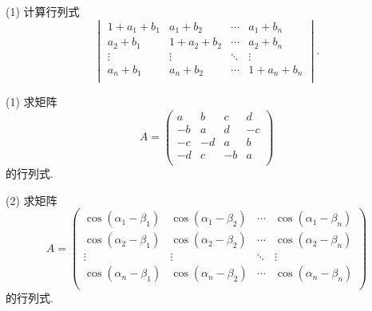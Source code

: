 \documentclass{ctexart}
\begin{document}
\begin{exercisec}[4.2.11(2)]
    (1) 计算行列式
    \[\begin{vmatrix}
        1+a_1+b_1 & a_1+b_2 & \cdots & a_1+b_n \\
        a_2+b_1 & 1+a_2+b_2 & \cdots & a_2+b_n \\
        \vdots & \vdots & \ddots & \vdots \\
        a_n+b_1 & a_n+b_2 & \cdots & 1+a_n+b_n \\
    \end{vmatrix}.\]
\end{exercisec}
\begin{exercisec}[4.2.12]
    (1) 求矩阵
    \[A=\begin{pmatrix}
        a & b & c & d \\
        -b & a & d & -c \\
        -c & -d & a & b \\
        -d & c & -b & a \\
    \end{pmatrix}\]
    的行列式.

    (2) 求矩阵
    \[A=\begin{pmatrix}
        \cos(\alpha_1-\beta_1) & \cos(\alpha_1-\beta_2) & \cdots & \cos(\alpha_1-\beta_n) \\
        \cos(\alpha_2-\beta_1) & \cos(\alpha_2-\beta_2) & \cdots & \cos(\alpha_2-\beta_n) \\
        \vdots & \vdots & \ddots & \vdots \\
        \cos(\alpha_n-\beta_1) & \cos(\alpha_n-\beta_2) & \cdots & \cos(\alpha_n-\beta_n) \\
    \end{pmatrix}\]
    的行列式.
\end{exercisec}
\end{document}
